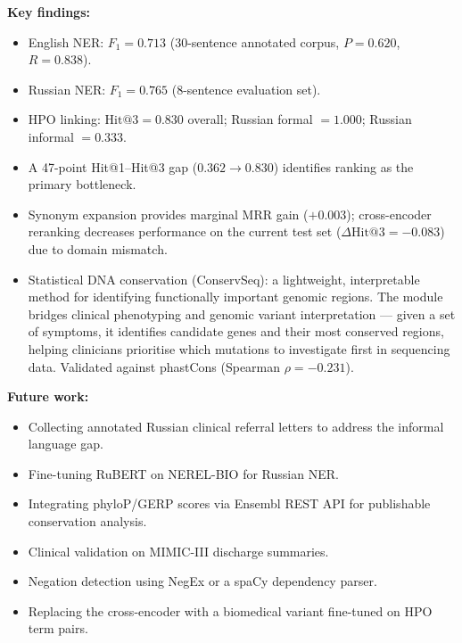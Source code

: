 \documentclass[11pt,a4paper]{article}
\begin{document}
\textbf{Key findings:}
\begin{itemize}[nosep]
  \item English NER: $F_1 = 0.713$ (30-sentence annotated corpus,
        $P = 0.620$, $R = 0.838$).
  \item Russian NER: $F_1 = 0.765$ (8-sentence evaluation set).
  \item HPO linking: $\text{Hit@3} = 0.830$ overall; Russian formal
        $= 1.000$; Russian informal $= 0.333$.
  \item A 47-point Hit@1--Hit@3 gap ($0.362 \to 0.830$) identifies ranking
        as the primary bottleneck.
  \item Synonym expansion provides marginal MRR gain ($+0.003$);
        cross-encoder reranking decreases performance on the current test set
        ($\Delta\text{Hit@3} = -0.083$) due to domain mismatch.
  \item Statistical DNA conservation (ConservSeq): a lightweight, interpretable
        method for identifying functionally important genomic regions.  The
        module bridges clinical phenotyping and genomic variant interpretation
        --- given a set of symptoms, it identifies candidate genes and their
        most conserved regions, helping clinicians prioritise which mutations
        to investigate first in sequencing data.  Validated against phastCons
        (Spearman $\rho = -0.231$).
\end{itemize}

\textbf{Future work:}
\begin{itemize}[nosep]
  \item Collecting annotated Russian clinical referral letters to address the
        informal language gap.
  \item Fine-tuning RuBERT on NEREL-BIO for Russian NER.
  \item Integrating phyloP/GERP scores via Ensembl REST API for publishable
        conservation analysis.
  \item Clinical validation on MIMIC-III discharge summaries.
  \item Negation detection using NegEx or a spaCy dependency parser.
  \item Replacing the cross-encoder with a biomedical variant fine-tuned on
        HPO term pairs.
\end{itemize}
\end{document}

